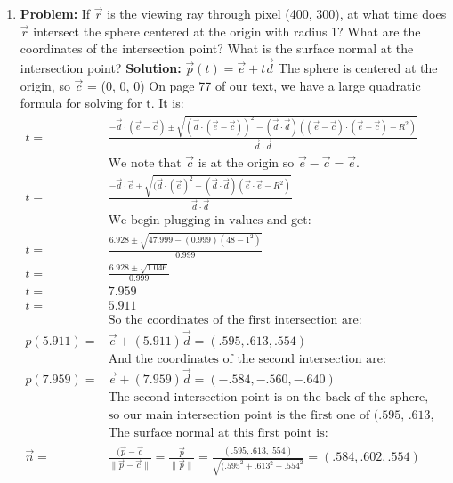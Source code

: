 \documentclass[a4paper, 12pt]{article}
\newcommand{\norm}[1]{\lVert#1\rVert}
\begin{document}
\begin{enumerate}
    \item \textbf{Problem:} If $\vec{r}$ is the viewing ray through pixel (400, 300), at what time does $\vec{r}$ intersect the sphere centered at the origin with radius 1? What are the coordinates of the intersection point?  What is the surface normal at the intersection point?
        \textbf{Solution:} $\vec{p}(t) = \vec{e} + t\vec{d}$ The sphere is centered at the origin, so $\vec{c}$ = (0, 0, 0) On page 77 of our text, we have a large quadratic formula for solving for t. It is:
        \begin{align*}
            t =& \frac{-\vec{d}\cdot(\vec{e}-\vec{c}) \pm \sqrt{(\vec{d}\cdot(\vec{e}-\vec{c}))^2 - (\vec{d}\cdot\vec{d})\left( (\vec{e}-\vec{c})\cdot(\vec{e}-\vec{c}) - R^2 \right)}}{\vec{d}\cdot\vec{d}}\\
            &\text{We note that $\vec{c}$ is at the origin so $\vec{e} - \vec{c} = \vec{e}$.}\\
            t =& \frac{-\vec{d}\cdot\vec{e} \pm \sqrt{(\vec{d}\cdot(\vec{e})^2 - (\vec{d}\cdot\vec{d})\left( \vec{e}\cdot\vec{e} - R^2 \right)}}{\vec{d}\cdot\vec{d}}\\
            &\text{We begin plugging in values and get:}\\
            t =& \frac{6.928 \pm \sqrt{47.999 - (0.999)\left( 48 - 1^2 \right)}}{0.999}\\
            t =& \frac{6.928 \pm \sqrt{1.046}}{0.999}\\
            t =& 7.959\\
            t =& 5.911\\
            &\text{So the coordinates of the first intersection are:}\\
            p(5.911) =& \vec{e} + (5.911)\vec{d} = (.595, .613, .554)\\
            &\text{And the coordinates of the second intersection are:}\\
            p(7.959) =& \vec{e} + (7.959)\vec{d} = (-.584, -.560, -.640)\\
            &\text{The second intersection point is on the back of the sphere,}\\
            &\text{so our main intersection point is the first one of (.595, .613, .554)}\\
            &\text{The surface normal at this first point is:}\\
            \vec{n} =& \frac{(\vec{p} - \vec{c}}{\norm{\vec{p} - \vec{c}}} = \frac{\vec{p}}{\norm{\vec{p}}} = \frac{(.595, .613, .554)}{\sqrt{(.595^2 + .613^2 + .554^2}} = (.584, .602, .554)\\
        \end{align*}




\end{enumerate}
\end{document}
